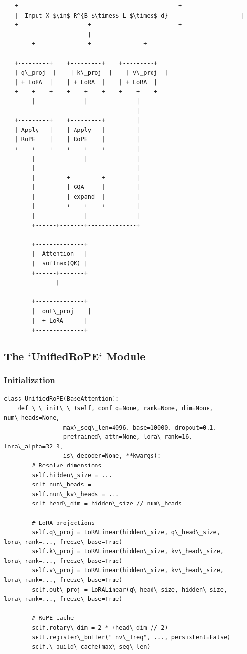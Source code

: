\begin{lstlisting}
   +----------------------------------------------+
   |  Input X $\in$ R^{B $\times$ L $\times$ d}                     |
   +--------------------+-------------------------+
                        |
        +---------------+---------------+
                                         
   +---------+    +---------+    +---------+
   | q\_proj  |    | k\_proj  |    | v\_proj  |
   | + LoRA  |    | + LoRA  |    | + LoRA  |
   +----+----+    +----+----+    +----+----+
        |              |              |
                                      |
   +---------+    +---------+         |
   | Apply   |    | Apply   |         |
   | RoPE    |    | RoPE    |         |
   +----+----+    +----+----+         |
        |              |              |
        |                             |
        |         +---------+         |
        |         | GQA     |         |
        |         | expand  |         |
        |         +----+----+         |
        |              |              |
        +------+-------+--------------+
                
        +--------------+
        |  Attention   |
        |  softmax(QK) |
        +------+-------+
               |
                
        +--------------+
        |  out\_proj    |
        |  + LoRA      |
        +--------------+
\end{lstlisting}

\subsection{The `UnifiedRoPE` Module}

\subsubsection{Initialization}

\begin{lstlisting}
class UnifiedRoPE(BaseAttention):
    def \_\_init\_\_(self, config=None, rank=None, dim=None, num\_heads=None,
                 max\_seq\_len=4096, base=10000, dropout=0.1,
                 pretrained\_attn=None, lora\_rank=16, lora\_alpha=32.0,
                 is\_decoder=None, **kwargs):
        # Resolve dimensions
        self.hidden\_size = ...
        self.num\_heads = ...
        self.num\_kv\_heads = ...
        self.head\_dim = hidden\_size // num\_heads
        
        # LoRA projections
        self.q\_proj = LoRALinear(hidden\_size, q\_head\_size, lora\_rank=..., freeze\_base=True)
        self.k\_proj = LoRALinear(hidden\_size, kv\_head\_size, lora\_rank=..., freeze\_base=True)
        self.v\_proj = LoRALinear(hidden\_size, kv\_head\_size, lora\_rank=..., freeze\_base=True)
        self.out\_proj = LoRALinear(q\_head\_size, hidden\_size, lora\_rank=..., freeze\_base=True)
        
        # RoPE cache
        self.rotary\_dim = 2 * (head\_dim // 2)
        self.register\_buffer("inv\_freq", ..., persistent=False)
        self.\_build\_cache(max\_seq\_len)
\end{lstlisting}

